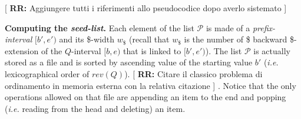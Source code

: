 \documentclass[runningheads,envcountsame,a4paper]{llncs}
\newcommand{\notaestesa}[2]{%
 \marginpar{\color{red!75!black}\textbf{\texttimes}}%
 {\color{red!75!black}%
 [\,\textbullet\,\textsf{\textbf{#1:}} %
 \textsf{\footnotesize#2}\,\textbullet\,]}%
}
\newcommand{\ie}{\textit{i.e.}\xspace}
\begin{document}







\begin{comment}
More precisely, the steps .... in algorithm \emph{processLinkedInterval}
directly provides the values of the new $\sigma Q$-interval and such
value is appended at the end of the new updated list (or file), in order
to maintain the lexicographic ordering.
In fact, the sorted property of the file, allows to update the files
while reading the files themselves, thus minimizing the operations on the
file.
\notaestesa{PB}{nota bene il passo dal 3 al 9 non si capisce come sia
implementato in termini di memoria esterna ed interna - io sarei per
descrivere la procedura processLinkedInterval- dettagliandola rispetto
ai linked intervals, che però vanno definiti prima, in termini
costruttivi}.


Intervals $[b,e)$ in $\mathcal{Q}_j$ represent common strings $Q$ of
length $(j+\tau)$.
Their link to the $rev(Q)$-interval $[b',e')$ on $B'$ is easily
maintained (during the backward extension of the intervals of length
$(j+\tau-1)$ to produce the intervals in $Q_j$) by Prop.~\ref{proposition:linked-intervals}.
This list is partioned into $|\Sigma|$ files according to the starting
symbol of $Q$, and maintained sorted by ascending value of the start
$b$.
\end{comment}

\notaestesa{RR}{Aggiungere tutti i riferimenti allo pseudocodice dopo averlo sistemato}

\noindent
{\bf  Computing the {\em seed-list}.}
Each element of the list $\mathcal{P}$ is made of a  \emph{prefix-interval} $[b',e')$
and its \$-width $w_\$ $ (recall that $w_\$ $ is  the number of     \$ backward \$-extension of  the $Q$-interval $[b,e)$ that is linked to $[b',e')$).
The list $\mathcal{P}$ is actually stored as a file and is sorted by ascending value of the starting
value $b'$ (\ie lexicographical order of $rev(Q)$). \notaestesa{RR}{Citare il classico problema di ordinamento in memoria esterna con la relativa citazione}.
Notice that the only operations allowed on that file are appending an item to
the end and popping (\ie reading from the head and deleting) an item.
\end{document}
